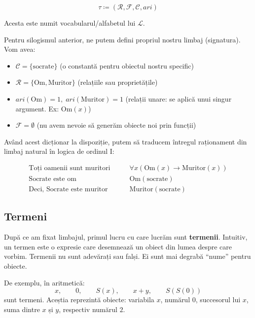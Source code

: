 \[
	\tau \coloneqq  (\mathcal{R}, \mathcal{F}, \mathcal{C}, ari)
\]

Acesta este numit vocabularul/alfabetul lui \( \mathcal{L} \).

\begin{eg}
	Pentru silogismul anterior, ne putem defini propriul nostru limbaj (signatura). Vom avea:

	\begin{itemize}
		\item \( \mathcal{C} = \{\mathrm{socrate}\} \) (o constantă pentru obiectul nostru specific)
		\item \( \mathcal{R} = \{\mathrm{Om}, \mathrm{Muritor}\} \) (relațiile sau proprietățile)
		\item \( ari(\mathrm{Om}) = 1, \; ari(\mathrm{Muritor}) = 1 \) (relații unare: se aplică unui singur argument. Ex: $\mathrm{Om}(x)$)
		\item \( \mathcal{F} = \emptyset \) (nu avem nevoie să generăm obiecte noi prin funcții)
	\end{itemize}

	Având acest dicționar la dispoziție, putem să traducem întregul
	raționa\-ment din limbaj natural în logica de ordinul I:

	\begin{align*}
		\text{Toți oamenii sunt muritori} \qquad & \forall x (\mathrm{Om}(x) \to \mathrm{Muritor}(x)) \\[1ex]
		\text{Socrate este om} \qquad            & \mathrm{Om}(\mathrm{socrate})                      \\[1ex]
		\text{Deci, Socrate este muritor} \qquad & \mathrm{Muritor}(\mathrm{socrate})
	\end{align*}
\end{eg}

\subsection{Termeni}

După ce am fixat limbajul, primul lucru cu care lucrăm sunt \textbf{termenii}. Intuitiv, un termen este o expresie care desemnează un obiect din lumea despre care vorbim.
Termenii nu sunt adevărați sau falși. Ei sunt mai degrabă ``nume'' pentru obiecte.

De exemplu, în aritmetică:
\[
	x, \qquad 0, \qquad S(x), \qquad x + y, \qquad S(S(0))
\]
sunt termeni. Aceștia reprezintă obiecte: variabila \(x\), numărul \(0\), succesorul lui \(x\), suma dintre \(x\) și \(y\), respectiv numărul \(2\).

